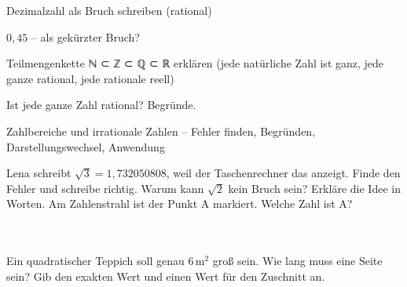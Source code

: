 \begin{aufgabe}{Dezimalzahl als Bruch schreiben (rational)}
\begin{teile}
\teil $0{,}45$ – als gekürzter Bruch? \leerfeld
\end{teile}
\end{aufgabe}

\begin{aufgabe}{Teilmengenkette ℕ ⊂ ℤ ⊂ ℚ ⊂ ℝ erklären (jede natürliche Zahl ist ganz, jede ganze rational, jede rationale reell)}
\begin{teile}
\teil Ist jede ganze Zahl rational? Begründe.
\end{teile}
\end{aufgabe}

\begin{aufgabe}{Zahlbereiche und irrationale Zahlen – Fehler finden, Begründen, Darstellungswechsel, Anwendung}
\begin{teile}
\teil Lena schreibt $\sqrt{3} = 1{,}732050808$, weil der Taschenrechner das anzeigt. Finde den Fehler und schreibe richtig.
\teil Warum kann $\sqrt{2}$ kein Bruch sein? Erkläre die Idee in Worten.
\teil Am Zahlenstrahl ist der Punkt A markiert. Welche Zahl ist A? \\  \\  \\ 

\teil Ein quadratischer Teppich soll genau $6\,\text{m}^2$ groß sein. Wie lang muss eine Seite sein? Gib den exakten Wert und einen Wert für den Zuschnitt an.
\end{teile}
\end{aufgabe}
